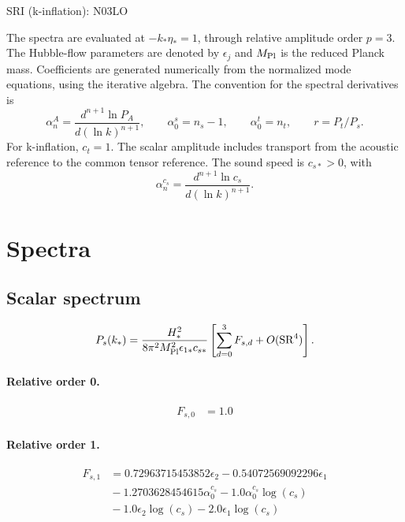 \documentclass[10pt]{article}
\begin{document}
\begin{center}\Large SRI (k-inflation): N03LO\end{center}
The spectra are evaluated at $-k_*\eta_*=1$, through relative amplitude
order $p=3$. The Hubble-flow parameters are denoted by $\epsilon_j$
and $M_{\rm Pl}$ is the reduced Planck mass. Coefficients are generated
numerically from the normalized mode equations, using the iterative algebra.
The convention for the spectral derivatives is
\[
\alpha_n^A=\frac{d^{n+1}\ln P_A}{d(\ln k)^{n+1}},\qquad
\alpha_0^s=n_s-1,\qquad\alpha_0^t=n_t,\qquad r=P_t/P_s.
\]
For k-inflation, $c_t=1$. The scalar amplitude includes transport from the acoustic reference to the common tensor reference. The sound speed is $c_{s*}>0$, with
\[\alpha_n^{c_s}=\frac{d^{n+1}\ln c_s}{d(\ln k)^{n+1}}.\]
\section{Spectra}

\subsection{Scalar spectrum}
\[P_s(k_*)=\frac{H_*^2}{8\pi^2M_{\rm Pl}^2\epsilon_{1*}c_{s*}}\left[\sum_{d=0}^{3}F_{s,d}+O(\mathrm{SR}^{4})\right].\]
\paragraph{Relative order 0.}
\begin{align*}
F_{s,0} &= 1.0
\end{align*}

\paragraph{Relative order 1.}
\begin{align*}
F_{s,1} &= 0.72963715453852 \epsilon_{2} - 0.54072569092296 \epsilon_{1} \\
&{}  - 1.2703628454615 \alpha_{0}^{c_s} - 1.0 \alpha_{0}^{c_s} \log{\left(c_{s} \right)} \\
&{}  - 1.0 \epsilon_{2} \log{\left(c_{s} \right)} - 2.0 \epsilon_{1} \log{\left(c_{s} \right)}
\end{align*}
\end{document}
